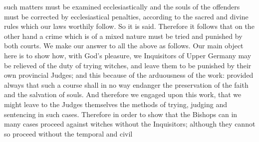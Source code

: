        such matters must be examined ecclesiastically and the souls of the offenders must be
       corrected by ecclesiastical penalties, according to the sacred and divine rules which our laws
       worthily follow. So it is said. Therefore it follows that on the other hand a crime which is of
       a mixed nature must be tried and punished by both courts.
              We make our answer to all the above as follows. Our main object here is to show how,
       with God's pleasure, we Inquisitors of Upper Germany may be relieved of the duty of trying
       witches, and leave them to be punished by their own provincial Judges; and this because of
       the arduousness of the work: provided always that such a course shall in no way endanger
       the preservation of the faith and the salvation of souls. And therefore we engaged upon this
       work, that we might leave to the Judges themselves the methods of trying, judging and
       sentencing in such cases.
              Therefore in order to show that the Bishops can in many cases proceed against witches
       without the Inquisitors; although they cannot so proceed without the temporal and civil

